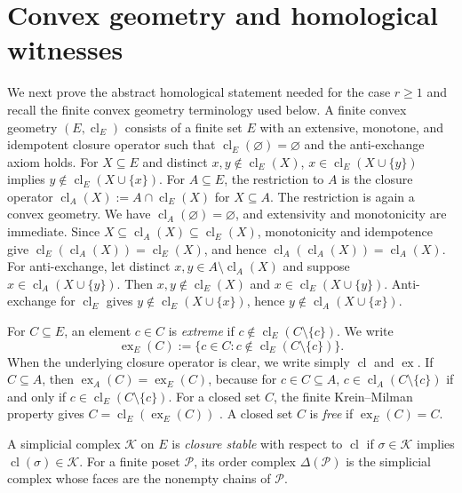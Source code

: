 \documentclass[11pt]{amsart}
\theoremstyle{definition}
\newcommand{\cl}{\operatorname{cl}}
\newcommand{\ex}{\operatorname{ex}}
\begin{document}
\section{Convex geometry and homological witnesses}\label{sec:3}

We next prove the abstract homological statement needed for the case $r\ge1$ and recall the finite convex geometry terminology used below. A finite convex geometry $(E,\cl_E)$ consists of a finite set $E$ with an extensive, monotone, and idempotent closure operator such that $\cl_E(\varnothing)=\varnothing$ and the anti-exchange axiom holds. For $X\subseteq E$ and distinct $x,y\notin\cl_E(X)$, $x\in\cl_E(X\cup\{y\})$ implies $y\notin\cl_E(X\cup\{x\})$. For $A\subseteq E$, the restriction to $A$ is the closure operator $\cl_A(X):=A\cap\cl_E(X)$ for $X\subseteq A$. The restriction is again a convex geometry. We have $\cl_A(\varnothing)=\varnothing$, and extensivity and monotonicity are immediate. Since $X\subseteq\cl_A(X)\subseteq\cl_E(X)$, monotonicity and idempotence give $\cl_E(\cl_A(X))=\cl_E(X)$, and hence $\cl_A(\cl_A(X))=\cl_A(X)$. For anti-exchange, let distinct $x,y\in A\setminus\cl_A(X)$ and suppose $x\in\cl_A(X\cup\{y\})$. Then $x,y\notin\cl_E(X)$ and $x\in\cl_E(X\cup\{y\})$. Anti-exchange for $\cl_E$ gives $y\notin\cl_E(X\cup\{x\})$, hence $y\notin\cl_A(X\cup\{x\})$.

For $C\subseteq E$, an element $c\in C$ is \emph{extreme} if $c\notin\cl_E(C\setminus\{c\})$. We write 
\[
\ex_E(C):=\{c\in C:c\notin\cl_E(C\setminus\{c\})\}.
\]
When the underlying closure operator is clear, we write simply $\cl$ and $\ex$. If $C\subseteq A$, then $\ex_A(C)=\ex_E(C)$, because for $c\in C\subseteq A$, $c\in\cl_A(C\setminus\{c\})$ if and only if $c\in\cl_E(C\setminus\{c\})$. For a closed set $C$, the finite Krein--Milman property gives $C=\cl_E(\ex_E(C))$ \cite{EdelmanJamison}. A closed set $C$ is \emph{free} if $\ex_E(C)=C$.

A simplicial complex $\mathcal K$ on $E$ is \emph{closure stable} with respect to $\cl$ if $\sigma\in\mathcal K$ implies $\cl(\sigma)\in\mathcal K$. For a finite poset $\mathcal P$, its order complex $\Delta(\mathcal P)$ is the simplicial complex whose faces are the nonempty chains of $\mathcal P$.
\end{document}
